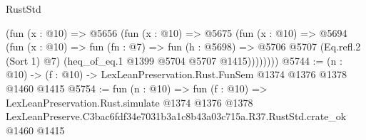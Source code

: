 \begin{lexlean}{RustStd}
\begin{coremodule}
          (fun (x : @10) =>
          @5656
            (fun (x : @10) =>
            @5675
              (fun (x : @10) =>
              @5694
                (fun (x : @10) =>
                fun (fn : @7) =>
                fun (h : @5698) =>
                @5706 @5707 (Eq.refl.{2} (Sort 1) @7) (heq_of_eq.{1} @1399 @5704 @5707 @1415))))))))
@5744 := (n : @10) -> (f : @10) -> LexLeanPreservation.Rust.FunSem @1374 @1376 @1378 @1460 @1415
@5754 := fun (n : @10) =>
  fun (f : @10) =>
  LexLeanPreservation.Rust.simulate
    @1374
    @1376
    @1378
    LexLeanPreserve.C3bac6fdf34e7031b3a1c8b43a03c715a.R37.RustStd.crate_ok
    @1460
    @1415
\end{coremodule}
\end{lexlean}
